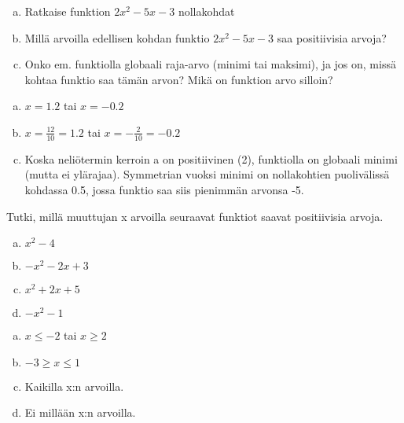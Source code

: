 \begin{tehtava}
  \begin{enumerate}[a)]
    \item Ratkaise funktion $2x^2 - 5x - 3$ nollakohdat
    \item Millä arvoilla edellisen kohdan funktio $2x^2 - 5x - 3$ saa positiivisia arvoja?
    \item Onko em. funktiolla globaali raja-arvo (minimi tai maksimi), ja jos on, missä kohtaa funktio saa tämän arvon? Mikä on funktion arvo silloin?
  \end{enumerate}

  \begin{vastaus}
    \begin{enumerate}[a)]
      \item $x = 1.2$ tai $x = -0.2$
      \item $x = \frac{12}{10} = 1.2$ tai $x = -\frac{2}{10} = -0.2$
      \item Koska neliötermin kerroin a on positiivinen (2), funktiolla on globaali minimi (mutta ei ylärajaa). Symmetrian vuoksi minimi on nollakohtien puolivälissä kohdassa 0.5, jossa funktio saa siis pienimmän arvonsa -5.
    \end{enumerate}
  \end{vastaus}
\end{tehtava}

\begin{tehtava}
  Tutki, millä muuttujan x arvoilla seuraavat funktiot saavat positiivisia arvoja.
  \begin{enumerate}[a)]
    \item $x^2 - 4$
    \item $-x^2 - 2x + 3$
    \item $x^2 + 2x + 5$
    \item $-x^2 - 1$    
  \end{enumerate}

  \begin{vastaus}
    \begin{enumerate}[a)]
      \item $x \leq -2$ tai $x \geq 2$
      \item $-3 \geq x \leq 1$
      \item Kaikilla x:n arvoilla.
      \item Ei millään x:n arvoilla.
    \end{enumerate}
  \end{vastaus}
\end{tehtava}